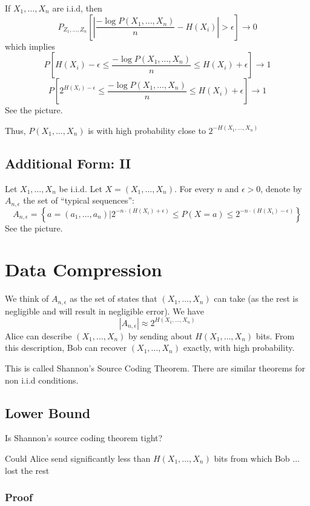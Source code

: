 \documentclass{article}
\begin{document}
If $X_1,\ldots, X_n$ are i.i.d, then 
\[
P_{Z_1,\ldots,Z_n}\left[ | \frac{-\log P(X_1,\ldots, X_n)}{n} - H(X_i) |>\epsilon \right] \to 0
\]
which implies 
\[
P\left[ H(X_i)-\epsilon \leq \frac{-\log P(X_1,\ldots, X_n)}{n} \leq H(X_i) + \epsilon \right] \to 1
\]
\[
P\left[ 2^{H(X_i)-\epsilon} \leq \frac{-\log P(X_1,\ldots, X_n)}{n} \leq H(X_i) + \epsilon \right] \to 1
\]
See the picture.

Thus, $P(X_1,\ldots,X_n)$ is with high probability close to $2^{-H\left(X_1,\ldots,X_n\right)}$

\subsection{Additional Form: II}

Let $X_1,\ldots,X_n$ be i.i.d. Let $X=\left(X_1,\ldots,X_n\right)$. For every $n$ and $\epsilon>0$, denote by $A_{n,\epsilon}$ the set of ``typical sequences'':
\[
A_{n,\epsilon}=\left\{a=\left(a_1,\ldots, a_n\right)\Big| 2^{-n\cdot \left(H(X_i) + \epsilon\right)}\leq P(X=a) \leq 2^{-n\cdot \left(H(X_i)-\epsilon\right)}\right\}
\]
See the picture.

\section{Data Compression}

We think of $A_{n,\epsilon}$ as the set of states that $\left(X_1,\ldots,X_n\right)$ can take (as the rest is negligible and will result in negligible error). We have 
\[
| A_{n,\epsilon} | \approx 2^{H(X_1,\ldots,X_n)}
\]
Alice can describe $\left(X_1,\ldots, X_n\right)$ by sending about $H(X_1,\ldots, X_n)$ bits. From this description, Bob can recover $\left(X_1,\ldots, X_n\right)$ exactly, with high probability.

This is called Shannon's Source Coding Theorem. There are similar theorems for non i.i.d conditions.

\subsection{Lower Bound}

Is Shannon's source coding theorem tight?

Could Alice send significantly less than $H\left(X_1,\ldots,X_n\right)$ bits from which Bob ... lost the rest

\subsubsection{Proof}
\end{document}
